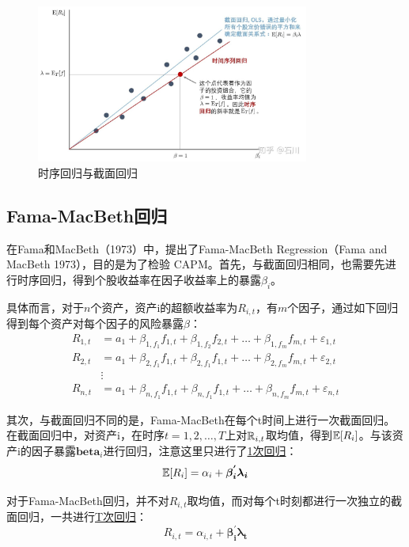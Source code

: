 \documentclass[11pt]{article}
\begin{document}
\begin{figure}[H]
    \centering
    \includegraphics[width=0.8\textwidth]{fig/ts_vs_cs.jpg}
    \caption{时序回归与截面回归}
    \label{fig:ts_vs_cs}
\end{figure}

\subsection{Fama-MacBeth回归}

在Fama和MacBeth（1973）中，提出了Fama-MacBeth Regression（Fama and MacBeth 1973），目的是为了检验 CAPM。首先，与截面回归相同，也需要先进行时序回归，得到个股收益率在因子收益率上的暴露$\beta_i$。

具体而言，对于$n$个资产，资产i的超额收益率为$R_{i,t}$，有$m$个因子，通过如下回归得到每个资产对每个因子的风险暴露$\beta$：
\begin{align*}
    R_{1,t} &= a_1 + \beta_{1,f_1} f_{1,t} + \beta_{1,f_2} f_{2,t} + \dots + \beta_{1,f_m} f_{m,t} + \varepsilon_{1,t} \\
    R_{2,t} &= a_1 + \beta_{2,f_1} f_{1,t} + \beta_{2,f_1} f_{1,t} + \dots + \beta_{2,f_m} f_{m,t} + \varepsilon_{2,t} \\
    &\vdots \\
    R_{n,t} &= a_1 + \beta_{n,f_1} f_{1,t} + \beta_{n,f_1} f_{1,t} + \dots + \beta_{n,f_m} f_{m,t} + \varepsilon_{n,t}
\end{align*}

其次，与截面回归不同的是，Fama-MacBeth在每个t时间上进行一次截面回归。在截面回归中，对资产i，在时序$t=1,2,\dots,T$上对$\mathbb{R}_{i,t}$取均值，得到$\mathbb{E}[R_i]$。与该资产i的因子暴露$\bm{beta}_i$进行回归，注意这里只进行了\uline{1次回归}：
\begin{equation*}
    \mathbb{E}[R_i] = \alpha_i + \bm{\beta_{i}^{'} \lambda_i}
\end{equation*}

对于Fama-MacBeth回归，并不对$R_{i,t}$取均值，而对每个t时刻都进行一次独立的截面回归，一共进行\uline{T次回归}：
\begin{equation*}
    R_{i,t} = \alpha_{i,t} + \bm{\beta_{i}^{'} \lambda_t}
\end{equation*}
\end{document}
